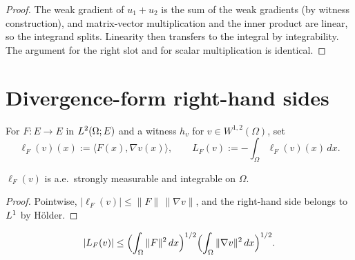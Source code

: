 \begin{proof}
\leanok
{}

The weak gradient of $u_1 + u_2$ is the sum of the weak gradients (by witness construction), and matrix-vector multiplication and the inner product are linear, so the integrand splits. Linearity then transfers to the integral by integrability. The argument for the right slot and for scalar multiplication is identical.
\end{proof}

\section{Divergence-form right-hand sides}

\begin{definition}
\label{def:divergenceRHSIntegrandOfField}
\leanok
{}
For $F : E \to E$ in $L^{2}(\Omega; E)$ and a witness $h_v$ for $v \in W^{1,2}(\Omega)$, set
\begin{equation*}
  \ell_F(v)(x) := \langle F(x), \nabla v(x)\rangle, \qquad
  L_F(v) := -\int_{\Omega} \ell_F(v)(x)\,dx.
\end{equation*}
\end{definition}

\begin{lemma}
\label{lem:aestronglyMeasurable_divergenceRHSIntegrandOfField}
\leanok
{}
$\ell_F(v)$ is a.e.\ strongly measurable and integrable on $\Omega$.
\end{lemma}

\begin{proof}
\leanok

Pointwise, $|\ell_F(v)| \leq \|F\|\,\|\nabla v\|$, and the right-hand side belongs to $L^{1}$ by H\"older.
\end{proof}

\begin{lemma}
\label{lem:divergenceRHSOfField_bound}
\leanok
{}
\begin{equation*}
  |L_F(v)| \leq \Bigl(\int_{\Omega}\|F\|^{2}\,dx\Bigr)^{1/2}
  \Bigl(\int_{\Omega}\|\nabla v\|^{2}\,dx\Bigr)^{1/2}.
\end{equation*}
\end{lemma}


